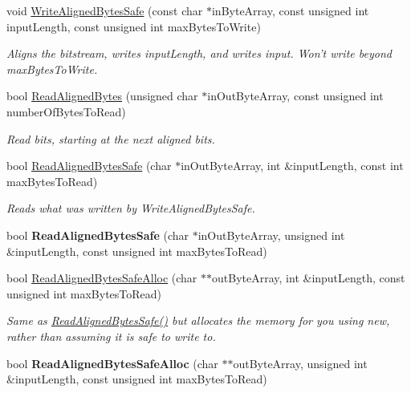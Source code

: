 \begin{DoxyCompactItemize}
\item 
void \hyperlink{class_rak_net_1_1_bit_stream_a2ae285a7aaba6f50b5ce8e5bf4163639}{Write\-Aligned\-Bytes\-Safe} (const char $\ast$in\-Byte\-Array, const unsigned int input\-Length, const unsigned int max\-Bytes\-To\-Write)
\begin{DoxyCompactList}\small\item\em Aligns the bitstream, writes input\-Length, and writes input. Won't write beyond max\-Bytes\-To\-Write. \end{DoxyCompactList}\item 
bool \hyperlink{class_rak_net_1_1_bit_stream_a1543023e7a84ecbf58a777aa2071b444}{Read\-Aligned\-Bytes} (unsigned char $\ast$in\-Out\-Byte\-Array, const unsigned int number\-Of\-Bytes\-To\-Read)
\begin{DoxyCompactList}\small\item\em Read bits, starting at the next aligned bits. \end{DoxyCompactList}\item 
bool \hyperlink{class_rak_net_1_1_bit_stream_a2fcd3b86367691647f66a81241358fe7}{Read\-Aligned\-Bytes\-Safe} (char $\ast$in\-Out\-Byte\-Array, int \&input\-Length, const int max\-Bytes\-To\-Read)
\begin{DoxyCompactList}\small\item\em Reads what was written by Write\-Aligned\-Bytes\-Safe. \end{DoxyCompactList}\item 
\hypertarget{class_rak_net_1_1_bit_stream_a5962d6042b534b562a948fc3b3e455e7}{bool {\bfseries Read\-Aligned\-Bytes\-Safe} (char $\ast$in\-Out\-Byte\-Array, unsigned int \&input\-Length, const unsigned int max\-Bytes\-To\-Read)}\label{class_rak_net_1_1_bit_stream_a5962d6042b534b562a948fc3b3e455e7}

\item 
bool \hyperlink{class_rak_net_1_1_bit_stream_a9ada145cbde1fb34dc4187b33ca5b4f6}{Read\-Aligned\-Bytes\-Safe\-Alloc} (char $\ast$$\ast$out\-Byte\-Array, int \&input\-Length, const unsigned int max\-Bytes\-To\-Read)
\begin{DoxyCompactList}\small\item\em Same as \hyperlink{class_rak_net_1_1_bit_stream_a2fcd3b86367691647f66a81241358fe7}{Read\-Aligned\-Bytes\-Safe()} but allocates the memory for you using new, rather than assuming it is safe to write to. \end{DoxyCompactList}\item 
\hypertarget{class_rak_net_1_1_bit_stream_afb1fd81a962cc69918e1b9b40bcb73f2}{bool {\bfseries Read\-Aligned\-Bytes\-Safe\-Alloc} (char $\ast$$\ast$out\-Byte\-Array, unsigned int \&input\-Length, const unsigned int max\-Bytes\-To\-Read)}\label{class_rak_net_1_1_bit_stream_afb1fd81a962cc69918e1b9b40bcb73f2}


\end{DoxyCompactItemize}
